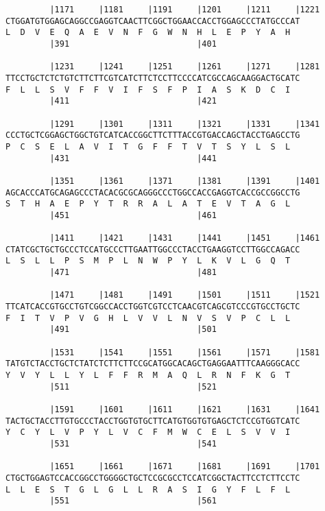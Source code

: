 \documentclass{article}
\begin{document}
\begin{Verbatim}
         |1171     |1181     |1191     |1201     |1211     |1221
CTGGATGTGGAGCAGGCCGAGGTCAACTTCGGCTGGAACCACCTGGAGCCCTATGCCCAT
L  D  V  E  Q  A  E  V  N  F  G  W  N  H  L  E  P  Y  A  H  
         |391                          |401                 
  
         |1231     |1241     |1251     |1261     |1271     |1281
TTCCTGCTCTCTGTCTTCTTCGTCATCTTCTCCTTCCCCATCGCCAGCAAGGACTGCATC
F  L  L  S  V  F  F  V  I  F  S  F  P  I  A  S  K  D  C  I  
         |411                          |421                 
  
         |1291     |1301     |1311     |1321     |1331     |1341
CCCTGCTCGGAGCTGGCTGTCATCACCGGCTTCTTTACCGTGACCAGCTACCTGAGCCTG
P  C  S  E  L  A  V  I  T  G  F  F  T  V  T  S  Y  L  S  L  
         |431                          |441                 
  
         |1351     |1361     |1371     |1381     |1391     |1401
AGCACCCATGCAGAGCCCTACACGCGCAGGGCCCTGGCCACCGAGGTCACCGCCGGCCTG
S  T  H  A  E  P  Y  T  R  R  A  L  A  T  E  V  T  A  G  L  
         |451                          |461                 
  
         |1411     |1421     |1431     |1441     |1451     |1461
CTATCGCTGCTGCCCTCCATGCCCTTGAATTGGCCCTACCTGAAGGTCCTTGGCCAGACC
L  S  L  L  P  S  M  P  L  N  W  P  Y  L  K  V  L  G  Q  T  
         |471                          |481                 
  
         |1471     |1481     |1491     |1501     |1511     |1521
TTCATCACCGTGCCTGTCGGCCACCTGGTCGTCCTCAACGTCAGCGTCCCGTGCCTGCTC
F  I  T  V  P  V  G  H  L  V  V  L  N  V  S  V  P  C  L  L  
         |491                          |501                 
  
         |1531     |1541     |1551     |1561     |1571     |1581
TATGTCTACCTGCTCTATCTCTTCTTCCGCATGGCACAGCTGAGGAATTTCAAGGGCACC
Y  V  Y  L  L  Y  L  F  F  R  M  A  Q  L  R  N  F  K  G  T  
         |511                          |521                 
  
         |1591     |1601     |1611     |1621     |1631     |1641
TACTGCTACCTTGTGCCCTACCTGGTGTGCTTCATGTGGTGTGAGCTCTCCGTGGTCATC
Y  C  Y  L  V  P  Y  L  V  C  F  M  W  C  E  L  S  V  V  I  
         |531                          |541                 
  
         |1651     |1661     |1671     |1681     |1691     |1701
CTGCTGGAGTCCACCGGCCTGGGGCTGCTCCGCGCCTCCATCGGCTACTTCCTCTTCCTC
L  L  E  S  T  G  L  G  L  L  R  A  S  I  G  Y  F  L  F  L  
         |551                          |561                 
  

\end{Verbatim}
\end{document}
